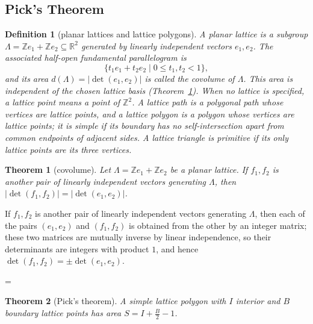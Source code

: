\documentclass[11pt]{article}
\makeatletter
\theoremstyle{ntstyle}
\newtheorem{theorem}{Theorem}[subsection]
\newtheorem{definition}{Definition}[subsection]
\let\nt@closedisplay\]
\def\nt@guardedclose{\@ifnextchar\par{\nt@closeafterpar}{\@ifnextchar\end{\postdisplaypenalty\@M\nt@closedisplay}{\nt@closedisplay}}}
\def\nt@closeafterpar\par{\@ifnextchar\par{\nt@closeafterpar}{\@ifnextchar\end{\postdisplaypenalty\@M\nt@closedisplay\par}{\nt@closedisplay\par}}}
\renewenvironment{proof}[1][\proofname]{\par
  \pushQED{\qed}\normalfont\topsep\medskipamount\edef\nt@afterproof{\@endparpenalty=\the\@endparpenalty\relax}\@beginparpenalty\@M\@endparpenalty\@M\let\]\nt@guardedclose\trivlist\item[]\textit{#1\@addpunct{.}} \ignorespaces}{\ifvmode\addpenalty\@M\fi\popQED\nt@afterproof\endtrivlist\@endpefalse}
\makeatother
\begin{document}
\subsection{Pick's Theorem}

\begin{definition}[planar lattices and lattice polygons]\label{def:10.8.1}
	A planar lattice is a subgroup
	$\Lambda=\mathbb{Z}e_1+\mathbb{Z}e_2\subseteq\mathbb{R}^2$ generated by
	linearly independent vectors $e_1,e_2$. The associated half-open
	fundamental parallelogram is
	\[
		\{t_1e_1+t_2e_2\mid 0\le t_1,t_2<1\},
	\]
	and its area $d(\Lambda)=|\det(e_1,e_2)|$ is called the covolume of
	$\Lambda$. This area is independent of the chosen lattice basis
	(Theorem~\ref{thm:10.8.1}). When no lattice
	is specified, a lattice point means a point of $\mathbb{Z}^2$. A lattice
	path is a polygonal path whose vertices are lattice points, and a lattice
	polygon is a polygon whose vertices are lattice points; it is simple if
	its boundary has no self-intersection apart from common endpoints of
	adjacent sides. A lattice triangle is primitive if its only lattice
	points are its three vertices.

\end{definition}
\begin{theorem}[covolume]\label{thm:10.8.1}
	Let $\Lambda=\mathbb{Z}e_1+\mathbb{Z}e_2$ be a planar lattice. If $f_1,f_2$ is
	another pair of linearly independent vectors generating $\Lambda$, then
	$|\det(f_1,f_2)|=|\det(e_1,e_2)|$.

\end{theorem}

\begin{proof} If $f_1,f_2$ is
	another pair of linearly independent vectors generating $\Lambda$, then
	each of the pairs $(e_1,e_2)$ and $(f_1,f_2)$ is obtained from the other
	by an integer matrix; these two matrices are mutually inverse by linear
	independence, so their determinants are integers with product $1$, and
	hence $\det(f_1,f_2)=\pm\det(e_1,e_2)$.

\end{proof}
\begin{theorem}[Pick's theorem]\label{thm:10.8.2} A simple lattice polygon
	with $I$ interior and $B$ boundary lattice points has area $S = I +
		\tfrac{B}{2} - 1$.

\end{theorem}
\end{document}
